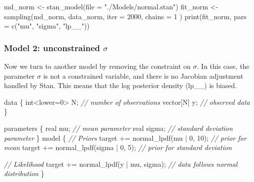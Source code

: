 \documentclass[
  letterpaper,
  DIV=11,
  numbers=noendperiod]{scrartcl}
\newenvironment{Shaded}{}{}
\newcommand{\AttributeTok}[1]{\textcolor[rgb]{0.65,0.15,0.64}{#1}}
\newcommand{\CommentTok}[1]{\textcolor[rgb]{0.63,0.63,0.65}{\textit{#1}}}
\newcommand{\DataTypeTok}[1]{\textcolor[rgb]{0.65,0.15,0.64}{#1}}
\newcommand{\DecValTok}[1]{\textcolor[rgb]{0.60,0.41,0.00}{#1}}
\newcommand{\FunctionTok}[1]{\textcolor[rgb]{0.25,0.47,0.95}{#1}}
\newcommand{\KeywordTok}[1]{\textcolor[rgb]{0.65,0.15,0.64}{#1}}
\newcommand{\NormalTok}[1]{\textcolor[rgb]{0.22,0.23,0.26}{#1}}
\newcommand{\OtherTok}[1]{\textcolor[rgb]{0.15,0.68,0.38}{#1}}
\newcommand{\StringTok}[1]{\textcolor[rgb]{0.31,0.63,0.31}{#1}}
\begin{document}
\begin{Shaded}
\begin{Highlighting}[]
\NormalTok{md\_norm }\OtherTok{\textless{}{-}} \FunctionTok{stan\_model}\NormalTok{(}\AttributeTok{file =} \StringTok{"./Models/normal.stan"}\NormalTok{)}
\NormalTok{fit\_norm }\OtherTok{\textless{}{-}} \FunctionTok{sampling}\NormalTok{(md\_norm, data\_norm,}
  \AttributeTok{iter =} \DecValTok{2000}\NormalTok{, }\AttributeTok{chains =} \DecValTok{1}
\NormalTok{)}
\FunctionTok{print}\NormalTok{(fit\_norm, }\AttributeTok{pars =} \FunctionTok{c}\NormalTok{(}\StringTok{"mu"}\NormalTok{, }\StringTok{"sigma"}\NormalTok{, }\StringTok{"lp\_\_"}\NormalTok{))}
\end{Highlighting}
\end{Shaded}

\subsubsection{\texorpdfstring{Model 2: unconstrained
\(\sigma\)}{Model 2: unconstrained \textbackslash sigma}}\label{model-2-unconstrained-sigma}

Now we turn to another model by removing the constraint on \(\sigma\).
In this case, the parameter \(\sigma\) is not a constrained variable,
and there is no Jacobian adjustment handled by Stan. This means that the
log posterior density (lp\_\_) is biased.

\begin{Shaded}
\begin{Highlighting}[]
\KeywordTok{data}\NormalTok{ \{}
  \DataTypeTok{int}\NormalTok{\textless{}}\KeywordTok{lower}\NormalTok{=}\DecValTok{0}\NormalTok{\textgreater{} N; }\CommentTok{// number of observations}
  \DataTypeTok{vector}\NormalTok{[N] y; }\CommentTok{// observed data}
\NormalTok{\}}

\KeywordTok{parameters}\NormalTok{ \{}
  \DataTypeTok{real}\NormalTok{ mu; }\CommentTok{// mean parameter}
  \DataTypeTok{real}\NormalTok{ sigma; }\CommentTok{// standard deviation parameter}
\NormalTok{\}}
\KeywordTok{model}\NormalTok{ \{}
  \CommentTok{// Priors}
  \KeywordTok{target +=}\NormalTok{ normal\_lpdf(mu | }\DecValTok{0}\NormalTok{, }\DecValTok{10}\NormalTok{); }\CommentTok{// prior for mean}
  \KeywordTok{target +=}\NormalTok{ normal\_lpdf(sigma | }\DecValTok{0}\NormalTok{, }\DecValTok{5}\NormalTok{); }\CommentTok{// prior for standard deviation}
  
  \CommentTok{// Likelihood}
  \KeywordTok{target +=}\NormalTok{ normal\_lpdf(y | mu, sigma); }\CommentTok{// data follows normal distribution}
\NormalTok{\}}
\end{Highlighting}
\end{Shaded}
\end{document}
